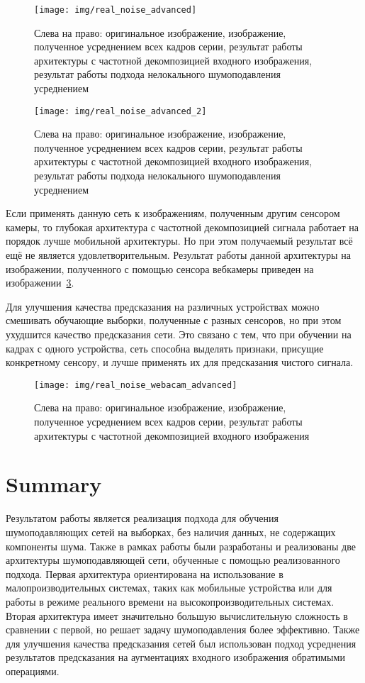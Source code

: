 \documentclass[runningheads]{llncs}
\begin{document}
\begin{figure}
	\centering
	\texttt{[image: img/real\_noise\_advanced]}
	\caption{Слева на право: оригинальное изображение, изображение, полученное усреднением всех кадров серии, результат работы архитектуры с частотной декомпозицией входного изображения, результат работы подхода нелокального шумоподавления усреднением}
	\label{fig:real_noise_advanced}
\end{figure}

\begin{figure}
	\centering
	\texttt{[image: img/real\_noise\_advanced\_2]}
	\caption{Слева на право: оригинальное изображение, изображение, полученное усреднением всех кадров серии, результат работы архитектуры с частотной декомпозицией входного изображения, результат работы подхода нелокального шумоподавления усреднением}
	\label{fig:real_noise_advanced_2}
\end{figure}


Если применять данную сеть к изображениям, полученным другим сенсором камеры, то глубокая архитектура с частотной декомпозицией сигнала работает на порядок лучше мобильной архитектуры. Но при этом получаемый результат всё ещё не является удовлетворительным. Результат работы данной архитектуры на изображении, полученного с помощью сенсора вебкамеры приведен на изображении~\ref{fig:real_noise_webacam_advanced}.

Для улучшения качества предсказания на различных устройствах можно смешивать обучающие выборки, полученные с разных сенсоров, но при этом ухудшится качество предсказания сети. Это связано с тем, что при обучении на кадрах с одного устройства, сеть способна выделять признаки, присущие конкретному сенсору, и лучше применять их для предсказания чистого сигнала.

\begin{figure}
	\centering
	\texttt{[image: img/real\_noise\_webacam\_advanced]}
	\caption{Слева на право: оригинальное изображение, изображение, полученное усреднением всех кадров серии, результат работы архитектуры с частотной декомпозицией входного изображения}
	\label{fig:real_noise_webacam_advanced}
\end{figure}

\section{Summary}

Результатом работы является реализация подхода для обучения шумоподавляющих сетей на выборках, без наличия данных, не содержащих компоненты шума. Также в рамках работы были разработаны и реализованы две архитектуры шумоподавляющей сети, обученные с помощью реализованного подхода. Первая архитектура ориентирована на использование в малопроизводительных системах, таких как мобильные устройства или для работы в режиме реального времени на высокопроизводительных системах. Вторая архитектура имеет значительно большую вычислительную сложность в сравнении с первой, но решает задачу шумоподавления более эффективно. Также для улучшения качества предсказания сетей был использован подход усреднения результатов предсказания на аугментациях входного изображения обратимыми операциями.
\end{document}
